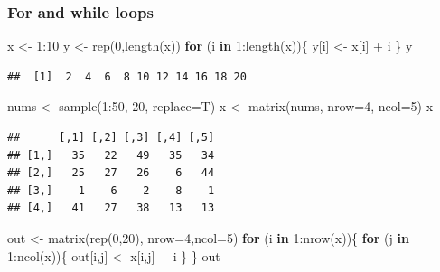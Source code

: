 \documentclass[]{article}
\newenvironment{Shaded}{\begin{snugshade}}{\end{snugshade}}
\newcommand{\AttributeTok}[1]{\textcolor[rgb]{0.77,0.63,0.00}{#1}}
\newcommand{\ControlFlowTok}[1]{\textcolor[rgb]{0.13,0.29,0.53}{\textbf{#1}}}
\newcommand{\DecValTok}[1]{\textcolor[rgb]{0.00,0.00,0.81}{#1}}
\newcommand{\FunctionTok}[1]{\textcolor[rgb]{0.00,0.00,0.00}{#1}}
\newcommand{\NormalTok}[1]{#1}
\newcommand{\OtherTok}[1]{\textcolor[rgb]{0.56,0.35,0.01}{#1}}
\newcommand{\SpecialCharTok}[1]{\textcolor[rgb]{0.00,0.00,0.00}{#1}}
\begin{document}
\hypertarget{for-and-while-loops}{%
\subsubsection{For and while loops}\label{for-and-while-loops}}

\begin{Shaded}
\begin{Highlighting}[]
\NormalTok{x }\OtherTok{\textless{}{-}} \DecValTok{1}\SpecialCharTok{:}\DecValTok{10}
\NormalTok{y }\OtherTok{\textless{}{-}} \FunctionTok{rep}\NormalTok{(}\DecValTok{0}\NormalTok{,}\FunctionTok{length}\NormalTok{(x))}
\ControlFlowTok{for}\NormalTok{ (i }\ControlFlowTok{in} \DecValTok{1}\SpecialCharTok{:}\FunctionTok{length}\NormalTok{(x))\{}
\NormalTok{  y[i] }\OtherTok{\textless{}{-}}\NormalTok{ x[i] }\SpecialCharTok{+}\NormalTok{ i}
\NormalTok{\}}
\NormalTok{y}
\end{Highlighting}
\end{Shaded}

\begin{verbatim}
##  [1]  2  4  6  8 10 12 14 16 18 20
\end{verbatim}

\begin{Shaded}
\begin{Highlighting}[]
\NormalTok{nums }\OtherTok{\textless{}{-}} \FunctionTok{sample}\NormalTok{(}\DecValTok{1}\SpecialCharTok{:}\DecValTok{50}\NormalTok{, }\DecValTok{20}\NormalTok{, }\AttributeTok{replace=}\NormalTok{T)}
\NormalTok{x }\OtherTok{\textless{}{-}} \FunctionTok{matrix}\NormalTok{(nums, }\AttributeTok{nrow=}\DecValTok{4}\NormalTok{, }\AttributeTok{ncol=}\DecValTok{5}\NormalTok{)}
\NormalTok{x}
\end{Highlighting}
\end{Shaded}

\begin{verbatim}
##      [,1] [,2] [,3] [,4] [,5]
## [1,]   35   22   49   35   34
## [2,]   25   27   26    6   44
## [3,]    1    6    2    8    1
## [4,]   41   27   38   13   13
\end{verbatim}

\begin{Shaded}
\begin{Highlighting}[]
\NormalTok{out }\OtherTok{\textless{}{-}} \FunctionTok{matrix}\NormalTok{(}\FunctionTok{rep}\NormalTok{(}\DecValTok{0}\NormalTok{,}\DecValTok{20}\NormalTok{), }\AttributeTok{nrow=}\DecValTok{4}\NormalTok{,}\AttributeTok{ncol=}\DecValTok{5}\NormalTok{)}
\ControlFlowTok{for}\NormalTok{ (i }\ControlFlowTok{in} \DecValTok{1}\SpecialCharTok{:}\FunctionTok{nrow}\NormalTok{(x))\{}
  \ControlFlowTok{for}\NormalTok{ (j }\ControlFlowTok{in} \DecValTok{1}\SpecialCharTok{:}\FunctionTok{ncol}\NormalTok{(x))\{}
\NormalTok{    out[i,j] }\OtherTok{\textless{}{-}}\NormalTok{ x[i,j] }\SpecialCharTok{+}\NormalTok{ i}
\NormalTok{  \}}
\NormalTok{\}}
\NormalTok{out}
\end{Highlighting}
\end{Shaded}
\end{document}
